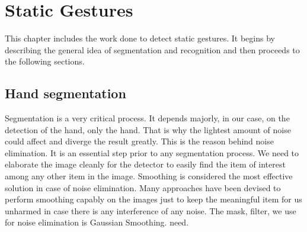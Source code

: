 

\section{Static Gestures}
This chapter includes the work done to detect static gestures. It begins by describing the general idea of segmentation and recognition and then proceeds to the following sections.\bigskip


\subsection{Hand segmentation}
Segmentation is a very critical process. It depends majorly, in our case, on the detection of the hand, only the hand. That is why the lightest amount of noise could affect and diverge the result greatly. This is the reason behind noise elimination. It is an essential step prior to any segmentation process. We need to elaborate the image cleanly for the detector to easily find the item of interest among any other item in the image. Smoothing is considered the most effective solution in case of noise elimination. Many approaches have been devised to perform smoothing capably on the images just to keep the meaningful item for us unharmed in case there is any interference of any noise. The mask, filter, we use for noise elimination is Gaussian Smoothing.
need.\bigskip
